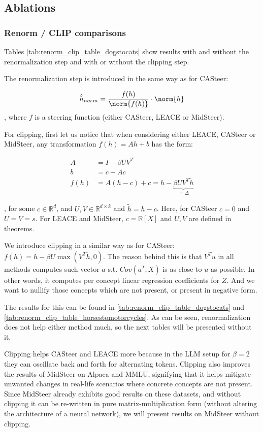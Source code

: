 \subsection{Ablations}

\subsubsection{Renorm / CLIP comparisons}

Tables \ref{tab:renorm_clip_table_dogstocats} show results with and without the renormalization step and with or without the clipping step.

The renormalization step is introduced in the same way as for CASteer:

\begin{align*}
    \hat{h}_{norm} = \frac{f(h)}{\norm{f(h)}} \cdot \norm{h}    
\end{align*}
, where $f$ is a steering function (either CASteer, LEACE or MidSteer).


For clipping, first let us notice that when considering either LEACE, CASteer or MidSteer, any transformation $f(h) = Ah + b$ has the form:

\begin{align*}
    A &= I - \beta U V^T \\
    b &= c - Ac \\
    f(h) &= A (h-c) + c = h - \underbrace{\beta UV^T \tilde{h}}_{=\Delta}
\end{align*}

, for some $c \in \mathbb{R}^d$, and $U, V \in \mathbb{R}^{d \times k}$ and $\tilde{h} = h - c$. Here, for CASteer $c=0$ and $U = V = s$. For LEACE and MidSteer, $c=\mathbb{R}[X]$ and $U, V$ are defined in theorems.

We introduce clipping in a similar way as for CASteer: $f(h) = h - \beta U \max(V^T \tilde{h}, 0)$. The reason behind this is that $V^T u$ in all methods computes such vector $a$ s.t. $Cov(a^T, X)$ is as close to $u$ as possible. In other words, it computes per concept linear regression coefficients for $Z$. And we want to nullify those concepts which are not present, or present in negative form.

The results for this can be found in \ref{tab:renorm_clip_table_dogstocats} and \ref{tab:renorm_clip_table_horsestomotorcycles}. As can be seen, renormalization does not help either method much, so the next tables will be presented without it.


Clipping helps CASteer and LEACE more because in the LLM setup for $\beta=2$ they can oscillate back and forth for alternating tokens. Clipping also improves the results of MidSteer on Alpaca and MMLU, signifying that it helps mitigate unwanted changes in real-life scenarios where concrete concepts are not present. Since MidSteer already exhibits good results on these datasets, and without clipping it can be re-written in pure matrix-multiplication form (without altering the architecture of a neural network), we will present results on MidSteer without clipping.



